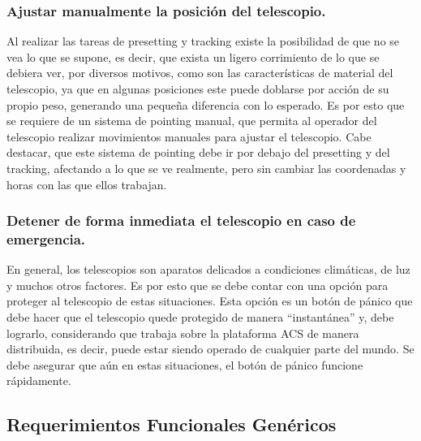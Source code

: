 \documentclass[letterpaper,spanish,10pt]{article}
\begin{document}
\subsubsection{Ajustar manualmente la posici\'on del telescopio.}
Al realizar las tareas de presetting y tracking existe la posibilidad de que no se vea lo que se supone, es decir, que exista un ligero corrimiento de lo que se debiera ver, por diversos motivos, como son las caracter\'isticas de material del telescopio, ya que en algunas posiciones este puede doblarse por acci\'on de su propio peso, generando una peque\~na diferencia con lo esperado. Es por esto que se requiere de un sistema de pointing manual, que permita al operador del telescopio realizar movimientos manuales para ajustar el telescopio. Cabe destacar, que este sistema de pointing debe ir por debajo del presetting y del tracking, afectando a lo que se ve realmente, pero sin cambiar las coordenadas y horas con las que ellos trabajan.


\subsubsection{Detener de forma inmediata el telescopio en caso de emergencia.}
En general, los telescopios son aparatos delicados a condiciones clim\'aticas, de luz y muchos otros factores. Es por esto que se debe contar con una opci\'on para proteger al telescopio de estas situaciones. Esta opci\'on es un bot\'on de p\'anico que debe hacer que el telescopio quede protegido de manera ``instant\'anea'' y, debe lograrlo, considerando que trabaja sobre la plataforma ACS de manera distribuida, es decir, puede estar siendo operado de cualquier parte del mundo. Se debe asegurar que a\'un en estas situaciones, el bot\'on de p\'anico funcione r\'apidamente.



\subsection{Requerimientos Funcionales Gen\'ericos}
\end{document}
